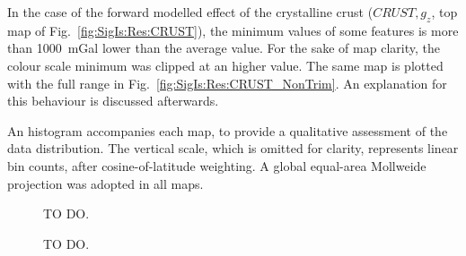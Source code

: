 In the case of the forward modelled effect of the crystalline crust ($CRUST, g_z$, top map of Fig.~\ref{fig:SigIs:Res:CRUST}), the minimum values of some features is more than \SI{1000}{mGal} lower than the average value.
For the sake of map clarity, the colour scale minimum was clipped at an higher value.
The same map is plotted with the full range in Fig.~\ref{fig:SigIs:Res:CRUST_NonTrim}.
An explanation for this behaviour is discussed afterwards.

An histogram accompanies each map, to provide a qualitative assessment of the data distribution.
The vertical scale, which is omitted for clarity, represents linear bin counts, after cosine-of-latitude weighting.
A global equal-area Mollweide projection was adopted in all maps.


\begin{figure}
    \begin{adjustbox}{center}
    \end{adjustbox}
    \caption[TO DO.]{TO DO.}
    \label{fig:SigIs:Res:GGM_BG}
\end{figure}

\begin{figure}
    \begin{adjustbox}{center}
    \end{adjustbox}
    \caption[TO DO.]{TO DO.}
    \label{fig:SigIs:Res:SEDS}
\end{figure}

